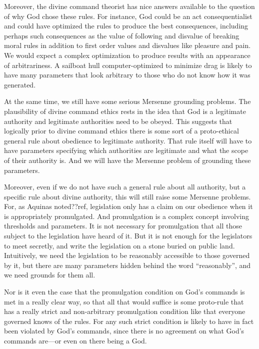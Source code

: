 Moreover, the divine command theorist has nice answers available to the question of why God chose these rules. For instance,
God could be an act consequentialist and could have optimized the rules to produce the best consequences, including perhaps
such consequences as the value of following and disvalue of breaking moral rules in addition to first order values and 
disvalues like pleasure and pain.  We would expect a complex optimization to produce results with an appearance of arbitrariness.
A sailboat hull computer-optimized to minimize drag is likely to have many parameters that look arbitrary to those who do not
know how it was generated.

At the same time, we still have some serious Mersenne grounding problems. The plausibility of divine command ethics rests in
the idea that God is a legitimate authority and legitimate authorities need to be obeyed. This suggests that logically prior
to divine command ethics there is some sort of a proto-ethical general rule about obedience to legitimate authority. That 
rule itself will have to have parameters specifying which authorities are legitimate and what the scope of their authority is. 
And we will have the Mersenne problem of grounding these parameters.

Moreover, even if we do not have such a general rule about all authority, but a specific rule about divine authority, this
will still raise some Mersenne problems. For, as Aquinas noted??ref, legislation only has a claim on our obedience when it 
is appropriately promulgated. And promulgation is a complex concept involving thresholds and parameters. It is not necessary
for promulgation that all those subject to the legislation have heard of it. But it is not enough for the legislators to
meet secretly, and write the legislation on a stone  buried on public land. Intuitively, we need the legislation to be 
reasonably accessible to those governed by it, but there are many parameters hidden behind the word ``reasonably'', and 
we need grounds for them all.

Nor is it even the case that the promulgation condition on God's commands is met in a really clear way, so that all that
would suffice is some proto-rule that has a really strict and non-arbitrary promulgation condition like that everyone 
governed knows of the rules. For any such strict condition is likely to have in fact been violated by God's commands, since
there is no agreement on what God's commands are---or even on there being a God.

What is worse, when we focus on the Mersenne cases in ethics, it unclear that divine commands instituting the parameters
would even satisfy a fairly modest promulgation that requires those who try really hard to be able to find what the legislation 
is when it is relevant to life. There surely are cases where we have tried really hard to figure out what is the right thing
to do and we didn't succeed. Perhaps it could be argued that we didn't try ``hard enough'', but now we are the true
Scotsman territory.??more?


